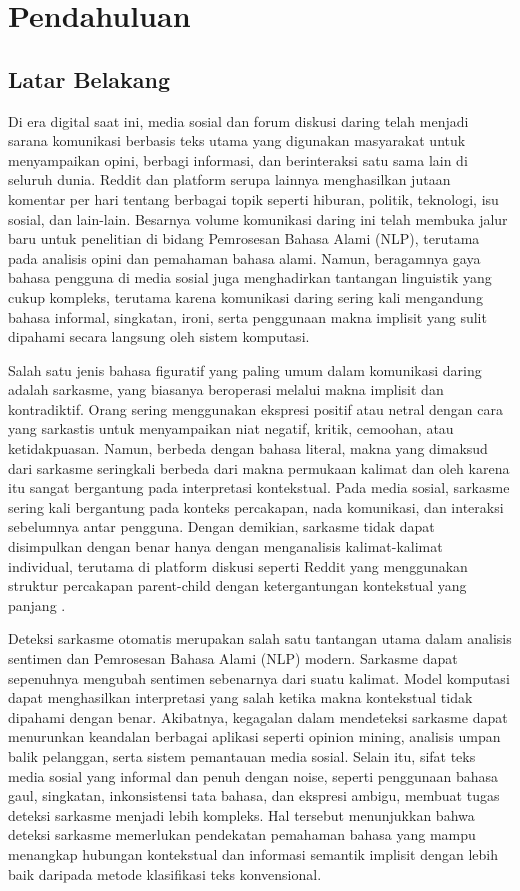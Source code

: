 \chapter{Pendahuluan}

\section{Latar Belakang}

Di era digital saat ini, media sosial dan forum diskusi daring telah menjadi sarana komunikasi berbasis teks utama yang digunakan masyarakat untuk menyampaikan opini, berbagi informasi, dan berinteraksi satu sama lain di seluruh dunia. Reddit dan platform serupa lainnya menghasilkan jutaan komentar per hari tentang berbagai topik seperti hiburan, politik, teknologi, isu sosial, dan lain-lain. Besarnya volume komunikasi daring ini telah membuka jalur baru untuk penelitian di bidang Pemrosesan Bahasa Alami (NLP), terutama pada analisis opini dan pemahaman bahasa alami. Namun, beragamnya gaya bahasa pengguna di media sosial juga menghadirkan tantangan linguistik yang cukup kompleks, terutama karena komunikasi daring sering kali mengandung bahasa informal, singkatan, ironi, serta penggunaan makna implisit yang sulit dipahami secara langsung oleh sistem komputasi.

Salah satu jenis bahasa figuratif yang paling umum dalam komunikasi daring adalah sarkasme, yang biasanya beroperasi melalui makna implisit dan kontradiktif. Orang sering menggunakan ekspresi positif atau netral dengan cara yang sarkastis untuk menyampaikan niat negatif, kritik, cemoohan, atau ketidakpuasan. Namun, berbeda dengan bahasa literal, makna yang dimaksud dari sarkasme seringkali berbeda dari makna permukaan kalimat dan oleh karena itu sangat bergantung pada interpretasi kontekstual. Pada media sosial, sarkasme sering kali bergantung pada konteks percakapan, nada komunikasi, dan interaksi sebelumnya antar pengguna. Dengan demikian, sarkasme tidak dapat disimpulkan dengan benar hanya dengan menganalisis kalimat-kalimat individual, terutama di platform diskusi seperti Reddit yang menggunakan struktur percakapan parent-child dengan ketergantungan kontekstual yang panjang \cite{dubey2025unpacking}.

Deteksi sarkasme otomatis merupakan salah satu tantangan utama dalam analisis sentimen dan Pemrosesan Bahasa Alami (NLP) modern. Sarkasme dapat sepenuhnya mengubah sentimen sebenarnya dari suatu kalimat. Model komputasi dapat menghasilkan interpretasi yang salah ketika makna kontekstual tidak dipahami dengan benar. Akibatnya, kegagalan dalam mendeteksi sarkasme dapat menurunkan keandalan berbagai aplikasi seperti opinion mining, analisis umpan balik pelanggan, serta sistem pemantauan media sosial. Selain itu, sifat teks media sosial yang informal dan penuh dengan noise, seperti penggunaan bahasa gaul, singkatan, inkonsistensi tata bahasa, dan ekspresi ambigu, membuat tugas deteksi sarkasme menjadi lebih kompleks. Hal tersebut menunjukkan bahwa deteksi sarkasme memerlukan pendekatan pemahaman bahasa yang mampu menangkap hubungan kontekstual dan informasi semantik implisit dengan lebih baik daripada metode klasifikasi teks konvensional.


